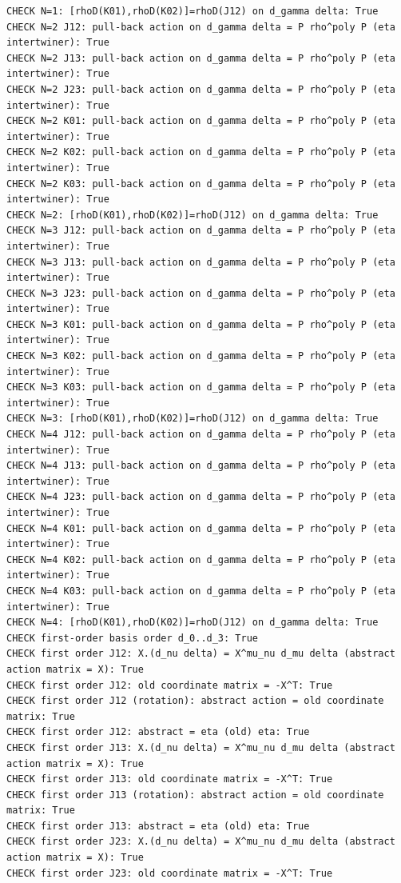 \documentclass{article}
\theoremstyle{remark}
\begin{document}
\begin{lstlisting}
CHECK N=1: [rhoD(K01),rhoD(K02)]=rhoD(J12) on d_gamma delta: True
CHECK N=2 J12: pull-back action on d_gamma delta = P rho^poly P (eta intertwiner): True
CHECK N=2 J13: pull-back action on d_gamma delta = P rho^poly P (eta intertwiner): True
CHECK N=2 J23: pull-back action on d_gamma delta = P rho^poly P (eta intertwiner): True
CHECK N=2 K01: pull-back action on d_gamma delta = P rho^poly P (eta intertwiner): True
CHECK N=2 K02: pull-back action on d_gamma delta = P rho^poly P (eta intertwiner): True
CHECK N=2 K03: pull-back action on d_gamma delta = P rho^poly P (eta intertwiner): True
CHECK N=2: [rhoD(K01),rhoD(K02)]=rhoD(J12) on d_gamma delta: True
CHECK N=3 J12: pull-back action on d_gamma delta = P rho^poly P (eta intertwiner): True
CHECK N=3 J13: pull-back action on d_gamma delta = P rho^poly P (eta intertwiner): True
CHECK N=3 J23: pull-back action on d_gamma delta = P rho^poly P (eta intertwiner): True
CHECK N=3 K01: pull-back action on d_gamma delta = P rho^poly P (eta intertwiner): True
CHECK N=3 K02: pull-back action on d_gamma delta = P rho^poly P (eta intertwiner): True
CHECK N=3 K03: pull-back action on d_gamma delta = P rho^poly P (eta intertwiner): True
CHECK N=3: [rhoD(K01),rhoD(K02)]=rhoD(J12) on d_gamma delta: True
CHECK N=4 J12: pull-back action on d_gamma delta = P rho^poly P (eta intertwiner): True
CHECK N=4 J13: pull-back action on d_gamma delta = P rho^poly P (eta intertwiner): True
CHECK N=4 J23: pull-back action on d_gamma delta = P rho^poly P (eta intertwiner): True
CHECK N=4 K01: pull-back action on d_gamma delta = P rho^poly P (eta intertwiner): True
CHECK N=4 K02: pull-back action on d_gamma delta = P rho^poly P (eta intertwiner): True
CHECK N=4 K03: pull-back action on d_gamma delta = P rho^poly P (eta intertwiner): True
CHECK N=4: [rhoD(K01),rhoD(K02)]=rhoD(J12) on d_gamma delta: True
CHECK first-order basis order d_0..d_3: True
CHECK first order J12: X.(d_nu delta) = X^mu_nu d_mu delta (abstract action matrix = X): True
CHECK first order J12: old coordinate matrix = -X^T: True
CHECK first order J12 (rotation): abstract action = old coordinate matrix: True
CHECK first order J12: abstract = eta (old) eta: True
CHECK first order J13: X.(d_nu delta) = X^mu_nu d_mu delta (abstract action matrix = X): True
CHECK first order J13: old coordinate matrix = -X^T: True
CHECK first order J13 (rotation): abstract action = old coordinate matrix: True
CHECK first order J13: abstract = eta (old) eta: True
CHECK first order J23: X.(d_nu delta) = X^mu_nu d_mu delta (abstract action matrix = X): True
CHECK first order J23: old coordinate matrix = -X^T: True

\end{lstlisting}
\end{document}
